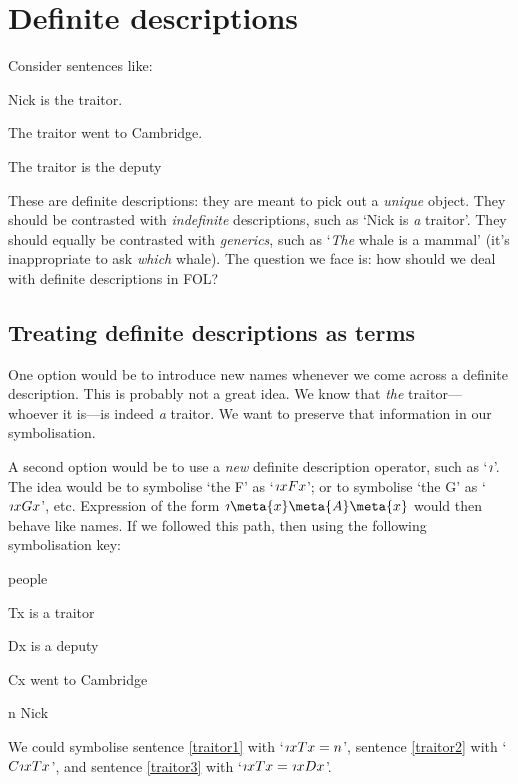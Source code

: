 \chapter{Definite descriptions}\label{subsec.defdesc}
Consider sentences like:
	\begin{earg}
		\item[\ex{traitor1}] Nick is the traitor.
		\item[\ex{traitor2}] The traitor went to Cambridge.
		\item[\ex{traitor3}] The traitor is the deputy 
	\end{earg}
These are definite descriptions: they are meant to pick out a \emph{unique} object. They should be contrasted with \emph{indefinite} descriptions, such as `Nick  is \emph{a} traitor'. They should equally be contrasted with \emph{generics}, such as `\emph{The} whale is a mammal' (it's inappropriate to ask \emph{which} whale). The question we face is: how should we deal with definite descriptions in FOL?


\section{Treating definite descriptions as terms}
One option would be to introduce new names whenever we come across a definite description. This is probably not a great idea. We know that \emph{the} traitor---whoever it is---is indeed \emph{a} traitor. We want to preserve that information in our symbolisation.

A second option would be to use a \emph{new} definite description operator, such as `$\maththe$'. The idea would be to symbolise `the F' as `$\maththe xFx$'; or to symbolise `the G' as `$\maththe xGx$', etc. Expression of the form $\maththe \meta{x} \meta{A}\meta{x}$ would then behave like names. If we followed this path, then using the following symbolisation key:
	\begin{ekey}
		\item[\text{domain}] people
		\item[Tx]  is a traitor
		\item[Dx]  is a deputy
		\item[Cx]  went to Cambridge
		\item[n] Nick
	\end{ekey}
We could symbolise sentence \ref{traitor1} with `$\maththe x Tx = n$', sentence \ref{traitor2} with `$C\maththe xTx$', and sentence \ref{traitor3} with `$\maththe x Tx = \maththe x Dx$'. 

